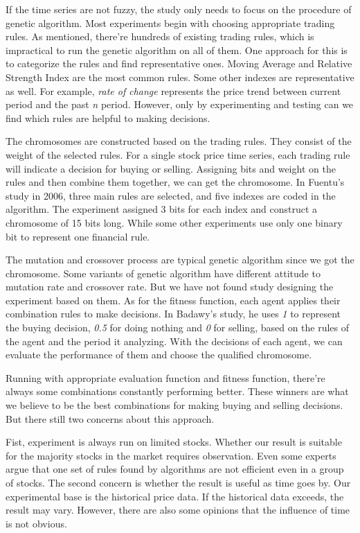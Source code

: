 \documentclass{article}
\begin{document}
If the time series are not fuzzy, the study only needs to focus on the procedure of genetic algorithm.
Most experiments begin with choosing appropriate trading rules.
As mentioned, there're hundreds of existing trading rules,
which is impractical to run the genetic algorithm on all of them.
One approach for this is to categorize the rules and find representative ones.
Moving Average and Relative Strength Index are the most common rules.
Some other indexes are representative as well.
For example, \emph{rate of change} represents the price trend between current period and the past \emph{n} period.
However, only by experimenting and testing can we find which rules are helpful to making decisions.

The chromosomes are constructed based on the trading rules.
They consist of the weight of the selected rules.
For a single stock price time series, each trading rule will indicate a decision for buying or selling.
Assigning bits and weight on the rules and then combine them together, we can get the chromosome.
In Fuentu's study in 2006, three main rules are selected, and five indexes are coded in the algorithm. \cite{de2006genetic}
The experiment assigned 3 bits for each index and construct a chromosome of 15 bits long.
While some other experiments use only one binary bit to represent one financial rule. \cite{korczak2002stock}

The mutation and crossover process are typical genetic algorithm since we got the chromosome.
Some variants of genetic algorithm have different attitude to mutation rate and crossover rate.
But we have not found study designing the experiment based on them.
As for the fitness function, each agent applies their combination rules to make decisions.
In Badawy's study, he uses \emph{1} to represent the buying decision, \emph{0.5} for doing nothing and \emph{0} for selling,
based on the rules of the agent and the period it analyzing. \cite{1609619}
With the decisions of each agent, we can evaluate the performance of them and choose the qualified chromosome.

Running with appropriate evaluation function and fitness function,
there're always some combinations constantly performing better.
These winners are what we believe to be the best combinations for making buying and selling decisions.
But there still two concerns about this approach.

Fist, experiment is always run on limited stocks.
Whether our result is suitable for the majority stocks in the market requires observation.
Even some experts argue that one set of rules found by algorithms are not efficient even in a group of stocks. \cite{korczak2002stock}
The second concern is whether the result is useful as time goes by.
Our experimental base is the historical price data.
If the historical data exceeds, the result may vary.
However, there are also some opinions that the influence of time is not obvious. \cite{korczak2002stock}
\end{document}

